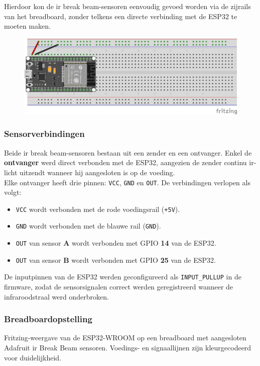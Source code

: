 Hierdoor kon de \gls{ir} break beam-sensoren eenvoudig gevoed worden via de zijrails van het breadboard, zonder telkens een directe verbinding met de ESP32 te moeten maken.

\begin{figure}[htbp]
    \centering
    \includegraphics[width=\textwidth]{img/bp/wachtruimtes/technische_uitwerking/voeding_configuratie.png}
    \label{fig:voedingconfiguratie}
\end{figure}

\subsubsection{Sensorverbindingen}
Beide \gls{ir} break beam-sensoren bestaan uit een zender en een ontvanger. Enkel de \textbf{ontvanger} werd direct verbonden met de ESP32, aangezien de zender continu \gls{ir}-licht uitzendt wanneer hij aangesloten is op de voeding. \\

Elke ontvanger heeft drie pinnen: \texttt{VCC}, \texttt{GND} en \texttt{OUT}. De verbindingen verlopen als volgt:

\begin{itemize}
    \item \texttt{VCC} wordt verbonden met de rode voedingsrail (\texttt{+5V}).
    \item \texttt{GND} wordt verbonden met de blauwe rail (\texttt{GND}).
    \item \texttt{OUT} van sensor \textbf{A} wordt verbonden met GPIO \textbf{14} van de ESP32.
    \item \texttt{OUT} van sensor \textbf{B} wordt verbonden met GPIO \textbf{25} van de ESP32.
\end{itemize}

De inputpinnen van de ESP32 werden geconfigureerd als \texttt{INPUT\_PULLUP} in de firmware, zodat de sensorsignalen correct werden geregistreerd wanneer de infraroodstraal werd onderbroken.

\subsubsection{Breadboardopstelling}
Fritzing-weergave van de ESP32-WROOM op een breadboard met aangesloten Adafruit \gls{ir} Break Beam sensoren. Voedings- en signaallijnen zijn kleurgecodeerd voor duidelijkheid.


